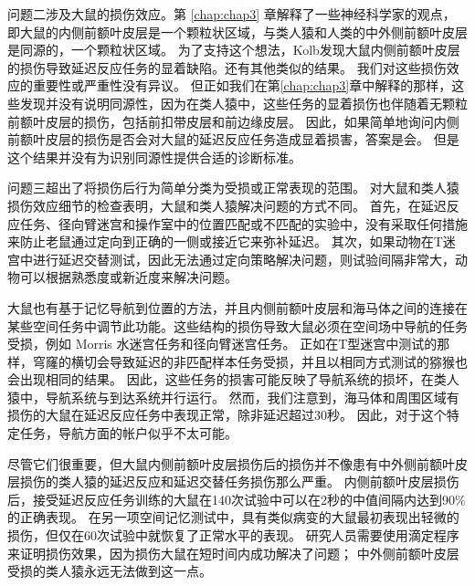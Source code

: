问题二涉及大鼠的损伤效应。第 \ref{chap:chap3} 章解释了一些神经科学家的观点，即大鼠的内侧前额叶皮层是一个颗粒状区域，与类人猿和人类的中外侧前额叶皮层是同源的，一个颗粒状区域。
为了支持这个想法，Kolb\cite{kolb1994dissociation}发现大鼠内侧前额叶皮层的损伤导致延迟反应任务的显着缺陷。还有其他类似的结果。
我们对这些损伤效应的重要性或严重性没有异议。
但正如我们在第\ref{chap:chap3}章中解释的那样，这些发现并没有说明同源性，因为在类人猿中，这些任务的显着损伤也伴随着无颗粒前额叶皮层的损伤，包括前扣带皮层和前边缘皮层\cite{meunier1997effects,rushworth2003effect}。
因此，如果简单地询问内侧前额叶皮层的损伤是否会对大鼠的延迟反应任务造成显着损害，答案是会。
但是这个结果并没有为识别同源性提供合适的诊断标准。
\par


问题三超出了将损伤后行为简单分类为受损或正常表现的范围。
对大鼠和类人猿损伤效应细节的检查表明，大鼠和类人猿解决问题的方式不同。
首先，在延迟反应任务\cite{kolb1974double}、径向臂迷宫\cite{kesner1989retrospective}和操作室中的位置匹配或不匹配\cite{sloan2006hippocampal}的实验中，没有采取任何措施来防止老鼠通过定向到正确的一侧或接近它来弥补延迟。
其次，如果动物在T迷宫中进行延迟交替测试，因此无法通过定向策略解决问题，则试验间隔非常大，动物可以根据熟悉度或新近度来解决问题\cite{sanderson2010spatial}。
\par


大鼠也有基于记忆导航到位置的方法\cite{kolb1994dissociation}，并且内侧前额叶皮层和海马体之间的连接在某些空间任务中调节此功能。这些结构的损伤导致大鼠必须在空间场中导航的任务受损，例如 Morris 水迷宫任务和径向臂迷宫任务\cite{kolb1994dissociation}。
正如在T型迷宫中测试的那样\cite{markowska1989comparative}，穹窿的横切会导致延迟的非匹配样本任务受损，并且以相同方式测试的猕猴也会出现相同的结果\cite{murray1989effects}。
因此，这些任务的损害可能反映了导航系统的损坏，在类人猿中，导航系统与到达系统并行运行。
然而，我们注意到，海马体和周围区域有损伤的大鼠在延迟反应任务中表现正常，除非延迟超过30秒\cite{alvarez1994animal}。
因此，对于这个特定任务，导航方面的帐户似乎不太可能。
\par


尽管它们很重要，但大鼠内侧前额叶皮层损伤后的损伤并不像患有中外侧前额叶皮层损伤的类人猿的延迟反应和延迟交替任务损伤那么严重。
内侧前额叶皮层损伤后，接受延迟反应任务训练的大鼠在140次试验中可以在2秒的中值间隔内达到90$\%$的正确表现\cite{kolb1994dissociation}。
在另一项空间记忆测试中，具有类似病变的大鼠最初表现出轻微的损伤，但仅在60次试验中就恢复了正常水平的表现\cite{kolb1974double}。
研究人员需要使用滴定程序来证明损伤效果，因为损伤大鼠在短时间内成功解决了问题\cite{kolb1994dissociation}；
中外侧前额叶皮层受损的类人猿永远无法做到这一点。
\par


